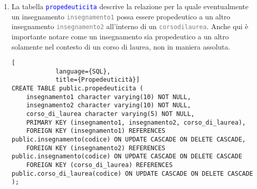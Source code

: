 \documentclass{article}
\newcommand{\tabb}[1]{\texttt{\textcolor{blue}{#1}}}
\newcommand{\attr}[1]{\texttt{\textcolor{gray}{#1}}}
\newcommand{\und}[0]{\textunderscore}
\begin{document}
\begin{enumerate}
        \begin{lstlisting}[
            language={SQL},
            title={Insegnamento parte di un Corso di Laurea}]
CREATE TABLE public.insegnamento_parte_di_cdl (
    insegnamento character varying(10) NOT NULL,
    corso_di_laurea character varying(5) NOT NULL,
    anno integer NOT NULL,
    PRIMARY KEY (insegnamento, corso_di_laurea, anno),
    FOREIGN KEY (corso_di_laurea) REFERENCES public.corso_di_laurea(codice) ON UPDATE CASCADE ON DELETE CASCADE,
    FOREIGN KEY (insegnamento) REFERENCES public.insegnamento(codice) ON UPDATE CASCADE ON DELETE CASCADE
);
        \end{lstlisting}

        \item La tabella \tabb{propedeuticita} descrive la relazione per la quale eventualmente un insegnamento \attr{insegnamento1} possa essere propedeutico a un altro insegnamento \attr{insegnamento2} all'interno di un \attr{corso\und di\und laurea}. Anche qui è importante notare come un insegnamento sia propedeutico a un altro solamente nel contesto di un corso di laurea, non in maniera assoluta.

        \begin{lstlisting}[
            language={SQL},
            title={Propedeuticità}]
CREATE TABLE public.propedeuticita (
    insegnamento1 character varying(10) NOT NULL,
    insegnamento2 character varying(10) NOT NULL,
    corso_di_laurea character varying(5) NOT NULL,
    PRIMARY KEY (insegnamento1, insegnamento2, corso_di_laurea),
    FOREIGN KEY (insegnamento1) REFERENCES public.insegnamento(codice) ON UPDATE CASCADE ON DELETE CASCADE,
    FOREIGN KEY (insegnamento2) REFERENCES public.insegnamento(codice) ON UPDATE CASCADE ON DELETE CASCADE
    FOREIGN KEY (corso_di_laurea) REFERENCES public.corso_di_laurea(codice) ON UPDATE CASCADE ON DELETE CASCADE
);
        \end{lstlisting}


\end{enumerate}
\end{document}

